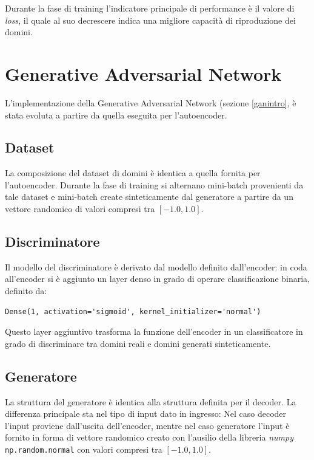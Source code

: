 Durante la fase di training l'indicatore principale di performance è il valore di \textit{loss}, il quale al suo decrescere indica una migliore capacità di riproduzione dei domini.

\newpage
\section{Generative Adversarial Network}
\label{imp:gan}
L'implementazione della Generative Adversarial Network (sezione \ref{ganintro}, è stata evoluta a partire da quella eseguita per l'autoencoder. 

\subsection{Dataset}
La composizione del dataset di domini è identica a quella fornita per l'autoencoder. Durante la fase di training si alternano mini-batch provenienti da tale dataset e mini-batch create sinteticamente dal generatore a partire da un vettore randomico di valori compresi tra $[-1.0,1.0]$.

\subsection{Discriminatore}
Il modello del discriminatore è derivato dal modello definito dall'encoder: in coda all'encoder si è aggiunto un layer denso in grado di operare classificazione binaria, definito da: 

\begin{lstlisting}
Dense(1, activation='sigmoid', kernel_initializer='normal')
\end{lstlisting}

Questo layer aggiuntivo trasforma la funzione dell'encoder in un classificatore in grado di discriminare tra domini reali e domini generati sinteticamente.

\subsection{Generatore}
La struttura del generatore è identica alla struttura definita per il decoder. La differenza principale sta nel tipo di input dato in ingresso: Nel caso decoder l'input proviene dall'uscita dell'encoder, mentre nel caso generatore l'input è fornito in forma di vettore randomico creato con l'ausilio della libreria \textit{numpy} \cite{numpy} \lstinline!np.random.normal! con valori compresi tra $[-1.0,1.0]$.

